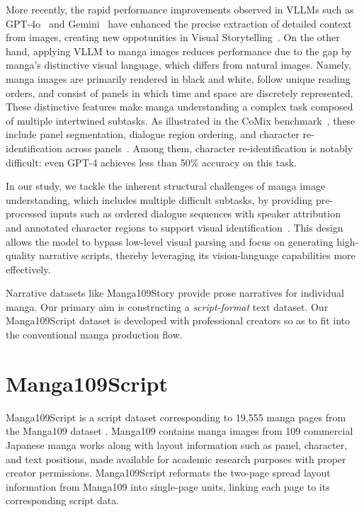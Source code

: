 \documentclass[sigconf, screen, review, anonymous]{acmart}
\begin{document}
More recently, the rapid performance improvements observed in VLLMs such as GPT-4o~\cite{wu_gpt-4o_2024} and Gemini~\cite{team_gemini_2024} have enhanced the precise extraction of detailed context from images, creating new oppotunities in Visual Storytelling~\cite{yang_storyllava_2025}.
On the other hand, applying VLLM to manga images reduces performance due to the gap by manga's distinctive visual language, which differs from natural images. Namely, manga images are primarily rendered in black and white, follow unique reading orders, and consist of panels in which time and space are discretely represented.
These distinctive features make manga understanding a complex task composed of multiple intertwined subtasks. As illustrated in the CoMix benchmark~\cite{vivoli_comicspap_2025}, these include panel segmentation, dialogue region ordering, and character re-identification across panels~\cite{sachdeva_manga_2024}. Among them, character re-identification is notably difficult: even GPT-4 achieves less than 50\% accuracy on this task\cite{vivoli_comicspap_2025}. 

In our study, we tackle the inherent structural challenges of manga image understanding, which includes multiple difficult subtasks, by providing pre-processed inputs such as ordered dialogue sequences with speaker attribution~\cite{li_manga109dialog_2024} and annotated character regions to support visual identification~\cite{shtedritski_what_2023}. This design allows the model to bypass low-level visual parsing and focus on generating high-quality narrative scripts, thereby leveraging its vision-language capabilities more effectively.

Narrative datasets like Manga109Story\cite{chen_manga_2024} provide prose narratives for individual manga.
Our primary aim is constructing a {\it script-format} text dataset. Our Manga109Script dataset is developed with professional creators so as to fit into the conventional manga production flow.


\section{Manga109Script}
Manga109Script is a script dataset corresponding to 19,555 manga pages from the Manga109 dataset \cite{matsui2017sketch,aizawa_building_2020}. Manga109 contains manga images from 109 commercial Japanese manga works along with layout information such as panel, character, and text positions, made available for academic research purposes with proper creator permissions. Manga109Script reformats the two-page spread layout information from Manga109 into single-page units, linking each page to its corresponding script data.
\end{document}
